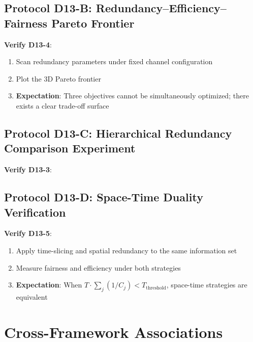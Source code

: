 \documentclass[12pt,a4paper]{article}
\begin{document}
\subsection{Protocol D13-B: Redundancy--Efficiency--Fairness Pareto Frontier}

\textbf{Verify D13-4}:
\begin{enumerate}
    \item Scan redundancy parameters under fixed channel configuration
    \item Plot the 3D Pareto frontier
    \item \textbf{Expectation}: Three objectives cannot be simultaneously optimized; there exists a clear trade-off surface
\end{enumerate}

\subsection{Protocol D13-C: Hierarchical Redundancy Comparison Experiment}

\textbf{Verify D13-3}:

\subsection{Protocol D13-D: Space-Time Duality Verification}

\textbf{Verify D13-5}:
\begin{enumerate}
    \item Apply time-slicing and spatial redundancy to the same information set
    \item Measure fairness and efficiency under both strategies
    \item \textbf{Expectation}: When $T \cdot \sum_j(1/C_j) < T_{}$, space-time strategies are equivalent
\end{enumerate}

\section{Cross-Framework Associations}
\end{document}
